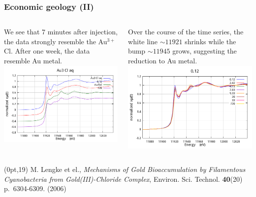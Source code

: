 \documentclass[10pt, xcolor=x11names, compress, handout]{beamer}
\begin{document}
\begin{frame}
  \frametitle{Economic geology (II)}

  \begin{columns}
    \begin{column}{0.5\linewidth}
      We see that \alert{7 minutes} after injection, the data strongly
      resemble the {\color{Blue3}Au$^{3+}$Cl}.  After
      {\color{Purple4}one week}, the data resemble
      {\color{Green4}Au metal}.\\[1ex]
      \includegraphics[width=\linewidth]{xas/aucl_data.png}
    \end{column}
    \begin{column}{0.5\linewidth}
      Over the course of the time series, the white line $\sim11921$
      shrinks while the bump $\sim11945$ grows, suggesting the
      reduction to Au metal.\\[1ex]
      \includegraphics[width=\linewidth]{xas/aucl_time.png}
    \end{column}
  \end{columns}

  \begin{textblock*}{0.5\linewidth}(0pt,19\TPVertModule) 
    \tiny
    M. Lengke et el., \textit{Mechanisms of Gold Bioaccumulation by
      Filamentous Cyanobacteria from Gold(III)-Chloride Complex},
    Environ. Sci. Technol. \textbf{40}(20) p.~6304-6309. (2006)
  \end{textblock*}
\end{frame}
\end{document}
